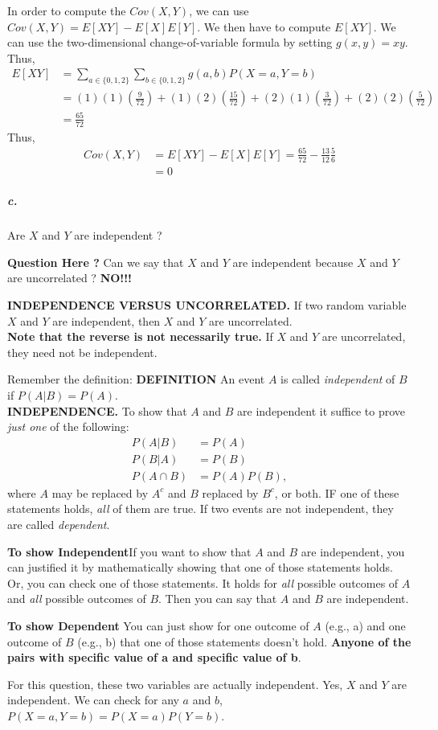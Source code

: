 \documentclass{article} %
\begin{document}
In order to compute the $Cov(X, Y)$, we can use $Cov(X, Y) = E[XY] - E[X]E[Y]$. We then have to compute $E[XY]$. We can use the two-dimensional change-of-variable formula by setting $g(x, y) = xy$. Thus, 
\begin{align*}
E[XY] & = \sum_{a\in \{0, 1, 2\}} \sum_{b\in \{0, 1, 2\}} g(a, b) P(X = a, Y = b) \\
& = (1)(1)(\frac{9}{72}) + (1)(2)(\frac{15}{72}) + (2)(1)(\frac{3}{72}) + (2)(2)(\frac{5}{72}) \\
& = \frac{65}{72}
\end{align*}
Thus, 
\begin{align*}
Cov(X, Y) & = E[XY] - E[X]E[Y] = \frac{65}{72} - \frac{13}{12}\frac{5}{6} \\
& = 0
\end{align*}

\subparagraph*{c.} Are $X$ and $Y$ are independent ? 

{\bf Question Here ?} Can we say that $X$ and $Y$ are independent because $X$ and $Y$ are uncorrelated ? 
{\bf NO!!!}

{\bf INDEPENDENCE VERSUS UNCORRELATED.} If two random variable $X$ and $Y$ are independent, then $X$ and $Y$ are uncorrelated. \\
{\bf Note that the reverse is not necessarily true.} If $X$ and $Y$ are uncorrelated, they need not be independent. 

Remember the definition: 
{\bf DEFINITION} An event $A$ is called {\it independent} of $B$ if $P(A|B) = P(A)$. \\
{\bf INDEPENDENCE.} To show that $A$ and $B$ are independent it suffice to prove {\it just one} of the following: 
\begin{align*}
P(A|B) & = P(A) \\
P(B|A) & = P(B) \\
P(A \cap B ) & = P(A) P(B), 
\end{align*}
where $A$ may be replaced by $A^c$ and $B$ replaced by $B^c$, or both. IF one of these statements holds, {\it all} of them are true. If two events are not independent, they are called {\it dependent}. 

{\bf To show Independent}If you want to show that $A$ and $B$ are independent, you can justified it by mathematically showing that one of those statements holds. Or, you can check one of those statements. It holds for {\it all} possible outcomes of $A$ and {\it all} possible outcomes of $B$. Then you can say that $A$ and $B$ are independent. 

{\bf To show Dependent} You can just show for one outcome of $A$ (e.g., a) and one outcome of $B$ (e.g., b) that one of those statements doesn't hold. {\bf Anyone of the pairs with specific value of a and specific value of b}. 

For this question, these two variables are actually independent. 
Yes, $X$ and $Y$ are independent. We can check for any $a$ and $b$, $P(X = a, Y = b) = P(X = a) P(Y = b)$. 
\end{document}
